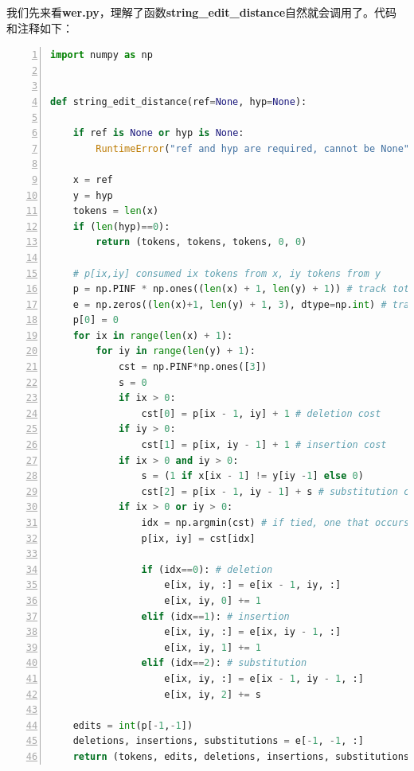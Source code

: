 我们先来看{\bf wer.py}，理解了函数{\bf string\_edit\_distance}自然就会调用了。代码和注释如下：
\begin{lstlisting}[language = python, numbers=left, 
         numberstyle=\tiny,keywordstyle=\color{blue!70},
         commentstyle=\color{red!50!green!50!blue!50},frame=shadowbox,
         rulesepcolor=\color{red!20!green!20!blue!20},basicstyle=\ttfamily]
import numpy as np


def string_edit_distance(ref=None, hyp=None):

    if ref is None or hyp is None:
        RuntimeError("ref and hyp are required, cannot be None")

    x = ref
    y = hyp
    tokens = len(x)
    if (len(hyp)==0):
        return (tokens, tokens, tokens, 0, 0)

    # p[ix,iy] consumed ix tokens from x, iy tokens from y
    p = np.PINF * np.ones((len(x) + 1, len(y) + 1)) # track total errors
    e = np.zeros((len(x)+1, len(y) + 1, 3), dtype=np.int) # track deletions, insertions, substitutions
    p[0] = 0
    for ix in range(len(x) + 1):
        for iy in range(len(y) + 1):
            cst = np.PINF*np.ones([3])
            s = 0
            if ix > 0:
                cst[0] = p[ix - 1, iy] + 1 # deletion cost
            if iy > 0:
                cst[1] = p[ix, iy - 1] + 1 # insertion cost
            if ix > 0 and iy > 0:
                s = (1 if x[ix - 1] != y[iy -1] else 0)
                cst[2] = p[ix - 1, iy - 1] + s # substitution cost
            if ix > 0 or iy > 0:
                idx = np.argmin(cst) # if tied, one that occurs first wins
                p[ix, iy] = cst[idx]

                if (idx==0): # deletion
                    e[ix, iy, :] = e[ix - 1, iy, :]
                    e[ix, iy, 0] += 1
                elif (idx==1): # insertion
                    e[ix, iy, :] = e[ix, iy - 1, :]
                    e[ix, iy, 1] += 1
                elif (idx==2): # substitution
                    e[ix, iy, :] = e[ix - 1, iy - 1, :]
                    e[ix, iy, 2] += s

    edits = int(p[-1,-1])
    deletions, insertions, substitutions = e[-1, -1, :]
    return (tokens, edits, deletions, insertions, substitutions)
\end{lstlisting}

